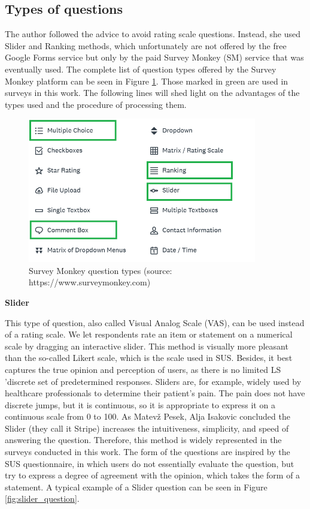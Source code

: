 \documentclass[a4paper,10pt,twoside]{article}
\begin{document}
\newpage
\vspace*{-1cm}
\subsection{Types of questions}

\noindent The author followed the advice to avoid rating scale questions. Instead, she used Slider and Ranking methods, which unfortunately are not offered by the free Google Forms service but only by the paid Survey Monkey (SM) service that was eventually used. The complete list of question types offered by the Survey Monkey platform can be seen in Figure \ref{fig:survey_monkey_options}. Those marked in green are used in surveys in this work. The following lines will shed light on the advantages of the types used and the procedure of processing them.

\vspace{0.3cm}
\begin{figure}[hbt!] 
\begin{center}
\includegraphics[width=10cm]{../pictures/survey_monkey_options.png} 
\caption[Survey Monkey answer types ]{Survey Monkey question types (source: https://www.surveymonkey.com)}
\label{fig:survey_monkey_options}
\end{center}
\end{figure}


\noindent \textbf {Slider}
\label{sec:slider}

\noindent This type of question, also called Visual Analog Scale (VAS), can be used instead of a rating scale. We let respondents rate an item or statement on a numerical scale by dragging an interactive slider. This method is visually more pleasant than the so-called Likert scale, which is the scale used in SUS. Besides, it best captures the true opinion and perception of users, as there is no limited LS 'discrete set of predetermined responses. Sliders are, for example, widely used by healthcare professionals to determine their patient's pain. The pain does not have discrete jumps, but it is continuous, so it is appropriate to express it on a continuous scale from 0 to 100. As Matevž Pesek, Alja Isakovic concluded the Slider (they call it Stripe) increases the intuitiveness, simplicity, and speed of answering the question. Therefore, this method is widely represented in the surveys conducted in this work. The form of the questions are inspired by the SUS questionnaire, in which users do not essentially evaluate the question, but try to express a degree of agreement with the opinion, which takes the form of a statement. A typical example of a Slider question can be seen in Figure \ref{fig:slider_question}.
\end{document}
